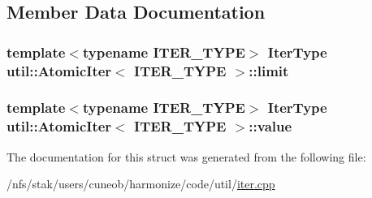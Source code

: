\subsection{Member Data Documentation}
\hypertarget{structutil_1_1AtomicIter_aa793192cf4d1a784e36512ab58d366e7}{
\subsubsection[{limit}]{\setlength{\rightskip}{0pt plus 5cm}template$<$typename I\-T\-E\-R\-\_\-\-T\-Y\-P\-E$>$ {\bf Iter\-Type} {\bf util\-::\-Atomic\-Iter}$<$ I\-T\-E\-R\-\_\-\-T\-Y\-P\-E $>$\-::limit}}\label{structutil_1_1AtomicIter_aa793192cf4d1a784e36512ab58d366e7}
\hypertarget{structutil_1_1AtomicIter_a774c1053e1735c852e7bdcf008ca403b}{
\subsubsection[{value}]{\setlength{\rightskip}{0pt plus 5cm}template$<$typename I\-T\-E\-R\-\_\-\-T\-Y\-P\-E$>$ {\bf Iter\-Type} {\bf util\-::\-Atomic\-Iter}$<$ I\-T\-E\-R\-\_\-\-T\-Y\-P\-E $>$\-::value}}\label{structutil_1_1AtomicIter_a774c1053e1735c852e7bdcf008ca403b}


The documentation for this struct was generated from the following file\-:\begin{DoxyCompactItemize}
\item 
/nfs/stak/users/cuneob/harmonize/code/util/\hyperlink{iter_8cpp}{iter.\-cpp}\end{DoxyCompactItemize}
